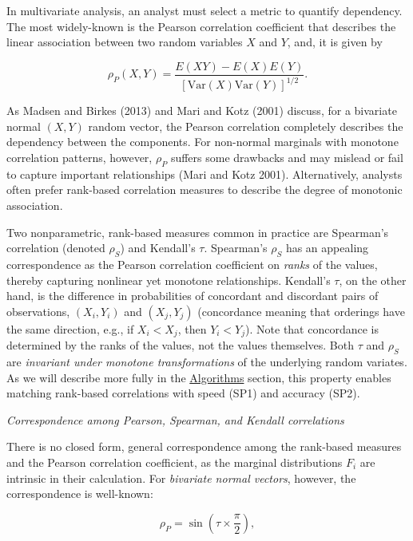 \documentclass{article}
\begin{document}
In multivariate analysis, an analyst must select a metric to quantify
dependency. The most widely-known is the Pearson correlation coefficient
that describes the linear association between two random variables \(X\)
and \(Y\), and, it is given by

\begin{equation}
\rho_P(X,Y) = \frac{E(XY) - E(X)E(Y)}{\left[ \mathrm{Var}(X)\mathrm{Var}(Y)\right]^{1/2}}.
\label{eq:pearson}
\end{equation}

As Madsen and Birkes (2013) and Mari and Kotz (2001) discuss, for a
bivariate normal \((X,Y)\) random vector, the Pearson correlation
completely describes the dependency between the components. For
non-normal marginals with monotone correlation patterns, however,
\(\rho_P\) suffers some drawbacks and may mislead or fail to capture
important relationships (Mari and Kotz 2001). Alternatively, analysts
often prefer rank-based correlation measures to describe the degree of
monotonic association.

Two nonparametric, rank-based measures common in practice are Spearman's
correlation (denoted \(\rho_S\)) and Kendall's \(\tau\). Spearman's
\(\rho_S\) has an appealing correspondence as the Pearson correlation
coefficient on \emph{ranks} of the values, thereby capturing nonlinear
yet monotone relationships. Kendall's \(\tau\), on the other hand, is
the difference in probabilities of concordant and discordant pairs of
observations, \((X_i, Y_i)\) and \((X_j, Y_j)\) (concordance meaning
that orderings have the same direction, e.g., if \(X_i < X_j\), then
\(Y_i < Y_j\)). Note that concordance is determined by the ranks of the
values, not the values themselves. Both \(\tau\) and \(\rho_S\) are
\emph{invariant under monotone transformations} of the underlying random
variates. As we will describe more fully in the
\protect\hyperlink{algorithms}{Algorithms} section, this property
enables matching rank-based correlations with speed (SP1) and accuracy
(SP2).

\emph{Correspondence among Pearson, Spearman, and Kendall correlations}

There is no closed form, general correspondence among the rank-based
measures and the Pearson correlation coefficient, as the marginal
distributions \(F_i\) are intrinsic in their calculation. For
\emph{bivariate normal vectors}, however, the correspondence is
well-known:

\begin{equation}
\label{eq:convertKendall}
\rho_{P} = \sin \left( \tau \times \frac{\pi}{2} \right), 
\end{equation}
\end{document}
